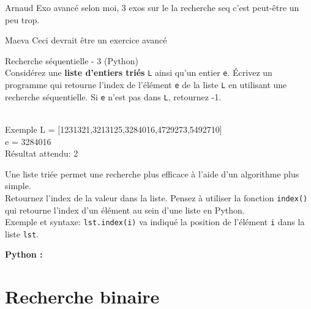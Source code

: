 \begin{note}{Arnaud}
    	Exo avancé selon moi, 3 exos sur le la recherche seq c'est peut-être un peu trop.
\end{note}

\begin{note}{Maeva}
    Ceci devrait être un exercice avancé
\end{note}
\begin{Exercice}[5 minutes] Recherche séquentielle - 3 (Python)\\

    Considérez une \textbf{liste d’entiers triés} \lstinline{L} ainsi qu’un entier \lstinline{e}. Écrivez un programme qui retourne l'index de l'élément \lstinline{e} de la liste \lstinline{L} en utilisant une recherche séquentielle. Si \lstinline{e} n’est pas dans \lstinline{L}, retournez -1.\\\\
    
    \begin{Example}{\faTerminal Exemple}
    L = [1231321,3213125,3284016,4729273,5492710]\\
    e = 3284016\\
    Résultat attendu: 2\\
    \end{Example}
  


    \begin{conseil}
        Une liste triée permet une recherche plus efficace à l'aide d'un algorithme plus simple.\\
        Retournez l'index de la valeur dans la liste. Pensez à utiliser la fonction \lstinline{index()} qui retourne l'index d'un élément au sein d'une liste en Python.\\Exemple et syntaxe: \lstinline{lst.index(i)} va indiqué la position de l'élément \lstinline{i} dans la liste \lstinline{lst}.
    \end{conseil}


    \begin{solution}
        \textbf{Python :}
        
    \end{solution}
\end{Exercice}

\newpage
\section{Recherche binaire}

